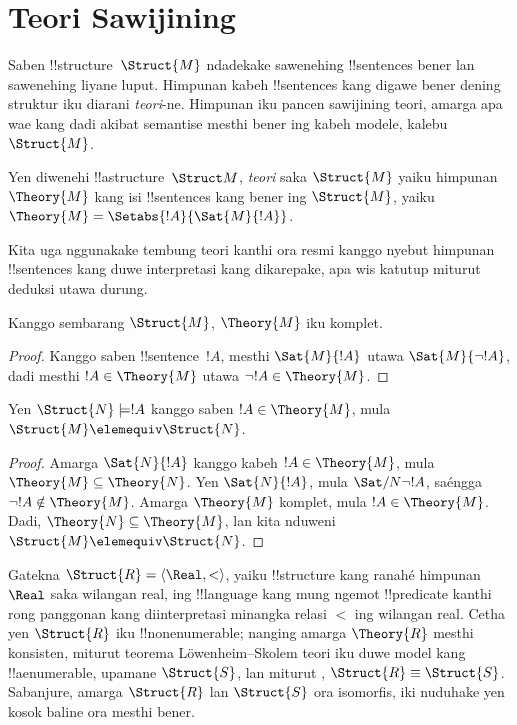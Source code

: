 \documentclass[../../../include/open-logic-section]{subfiles}
\begin{document}

\section{Teori Sawijining }

Saben !!{structure}~$\Struct{M}$ ndadekake sawenehing
!!{sentence}s bener lan sawenehing liyane luput.
Himpunan kabeh !!{sentence}s kang digawe bener
dening struktur iku diarani \emph{teori}-ne.
Himpunan iku pancen sawijining teori, amarga
apa wae kang dadi akibat semantise mesthi
bener ing kabeh modele, kalebu~$\Struct{M}$.

\begin{defn}
  Yen diwenehi !!a{structure}~$\Struct M$,
  \emph{teori} saka $\Struct{M}$ yaiku
  himpunan $\Theory{M}$ kang isi !!{sentence}s
  kang bener ing $\Struct{M}$, yaiku
  $\Theory{M} = \Setabs{!A}{\Sat{M}{!A}}$.
\end{defn}

Kita uga nggunakake tembung teori
kanthi ora resmi kanggo nyebut himpunan
!!{sentence}s kang duwe interpretasi
kang dikarepake, apa wis katutup
miturut deduksi utawa durung.

\begin{prop}
Kanggo sembarang $\Struct{M}$,
$\Theory{M}$ iku komplet.
\end{prop}

\begin{proof}
Kanggo saben !!{sentence}~$!A$,
mesthi $\Sat{M}{!A}$ utawa
$\Sat{M}{\lnot !A}$,
dadi mesthi $!A \in \Theory{M}$
utawa $\lnot !A \in \Theory{M}$.
\end{proof}

\begin{prop}
  Yen $\Struct{N} \models !A$
  kanggo saben $!A \in \Theory{M}$,
  mula $\Struct{M} \elemequiv \Struct{N}$.
\end{prop}

\begin{proof}
Amarga $\Sat{N}{!A}$ kanggo kabeh
$!A \in \Theory{M}$, mula
$\Theory{M} \subseteq
\Theory{N}$. Yen $\Sat{N}{!A}$,
mula $\Sat/{N}{\lnot !A}$,
saéngga $\lnot !A
\notin \Theory{M}$. Amarga
$\Theory{M}$ komplet, mula
$!A \in \Theory{M}$. Dadi,
$\Theory{N} \subseteq \Theory{M}$,
lan kita nduweni
$\Struct{M} \elemequiv \Struct{N}$.
\end{proof}

\begin{rem}
  Gatekna $\Struct{R} = \langle\Real, <\rangle$,
  yaiku !!{structure} kang ranahé
  himpunan $\Real$ saka wilangan real,
  ing !!{language} kang mung ngemot
  !!{predicate} kanthi rong panggonan
  kang diinterpretasi minangka relasi
  $<$ ing wilangan real. Cetha yen
  $\Struct{R}$ iku !!{nonenumerable};
  nanging amarga $\Theory{R}$
  mesthi konsisten, miturut teorema
  L\"owenheim--Skolem teori iku
  duwe model kang !!a{enumerable},
  upamane $\Struct{S}$, lan
  miturut ,
  $\Struct{R}
  \equiv \Struct{S}$. Sabanjure,
  amarga $\Struct{R}$ lan $\Struct{S}$
  ora isomorfis, iki nuduhake yen
  kosok baline
  ora mesthi bener.
\end{rem}
\end{document}
